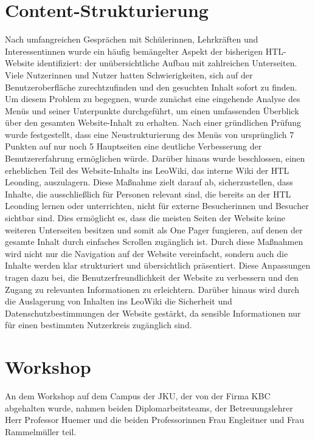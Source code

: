 \section{Content-Strukturierung}
Nach umfangreichen Gesprächen mit Schülerinnen, Lehrkräften und Interessentinnen wurde ein häufig bemängelter Aspekt der 
bisherigen HTL-Website identifiziert: der unübersichtliche Aufbau mit zahlreichen Unterseiten. Viele Nutzerinnen und Nutzer
 hatten Schwierigkeiten, sich auf der Benutzeroberfläche zurechtzufinden und den gesuchten Inhalt sofort zu finden. Um diesem Problem 
 zu begegnen, wurde zunächst eine eingehende Analyse des Menüs und seiner Unterpunkte durchgeführt, um einen umfassenden Überblick 
 über den gesamten Website-Inhalt zu erhalten. Nach einer gründlichen Prüfung wurde festgestellt, dass eine Neustrukturierung des 
 Menüs von ursprünglich 7 Punkten auf nur noch 5 Hauptseiten eine deutliche Verbesserung der Benutzererfahrung ermöglichen würde.
Darüber hinaus wurde beschlossen, einen erheblichen Teil des Website-Inhalts ins LeoWiki, das interne Wiki der HTL Leonding, 
auszulagern. Diese Maßnahme zielt darauf ab, sicherzustellen, dass Inhalte, die ausschließlich für Personen relevant sind, 
die bereits an der HTL Leonding lernen oder unterrichten, nicht für externe Besucherinnen und Besucher sichtbar sind. Dies ermöglicht 
es, dass die meisten Seiten der Website keine weiteren Unterseiten besitzen und somit als One Pager fungieren, auf denen der gesamte 
Inhalt durch einfaches Scrollen zugänglich ist.
Durch diese Maßnahmen wird nicht nur die Navigation auf der Website vereinfacht, sondern auch die Inhalte werden klar strukturiert 
und übersichtlich präsentiert. Diese Anpassungen tragen dazu bei, die Benutzerfreundlichkeit der Website zu verbessern und den 
Zugang zu relevanten Informationen zu erleichtern. Darüber hinaus wird durch die Auslagerung von Inhalten ins LeoWiki die Sicherheit 
und Datenschutzbestimmungen der Website gestärkt, da sensible Informationen nur für einen bestimmten Nutzerkreis zugänglich sind.


\section{Workshop}
An dem Workshop auf dem Campus der JKU, der von der Firma KBC abgehalten wurde, nahmen beiden Diplomarbeitsteams, der Betreuungslehrer Herr Professor Huemer und die beiden Professorinnen 
Frau Engleitner und Frau Rammelmüller teil. 


